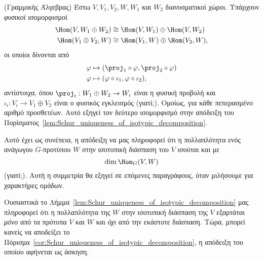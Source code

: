 \documentclass[12pt,a4paper,reqno]{amsart}
\begin{document}
\begin{remark}{{\rm(Γραμμικής Άλγεβρας)}}
Έστω $V, V_1, V_2, W, W_1$ και $W_2$ διανυσματικοί χώροι. Υπάρχουν \emph{φυσικοί} ισομορφισμοί 
\begin{align*}
    \Hom(V, W_1 \oplus W_2) &\cong \Hom(V,W_1) \oplus \Hom(V,W_2) \\ 
    \Hom(V_1\oplus V_2, W) &\cong \Hom(V_1,W) \oplus \Hom(V_2,W),
\end{align*}
οι οποίοι δίνονται από 
\begin{align*}
    \varphi &\mapsto (\proj_1\circ\varphi, \proj_2\circ\varphi) \\ 
    \varphi &\mapsto (\varphi\circ\iota_1, \varphi\circ\iota_2),
\end{align*}
αντίστοιχα, όπου $\proj_i : W_1 \oplus W_2 \to W_i$ είναι η φυσική προβολή και $\iota_i : V_i \to V_1 \oplus V_2$ είναι ο φυσικός εγκλεισμός (γιατί;). Ομοίως, για κάθε πεπερασμένο αριθμό προσθετέων. Αυτό εξηγεί τον δεύτερο ισομορφισμό στην απόδειξη του Πορίσματος~\ref{lem:Schur_uniqueness_of_isotypic_decomposition}.

Αυτό έχει ως συνέπεια, η  απόδειξη να μας πληροφορεί ότι η πολλαπλότητα ενός ανάγωγου $G$-προτύπου $W$ στην ισοτυπική διάσπαση του $V$ ισούται και με 
\[
\dim\Hom_G(V,W)
\]
(γιατί;). Αυτή η συμμετρία θα εξηγεί σε επόμενες παραγράφους, όταν μιλήσουμε για χαρακτήρες ομάδων.
\end{remark}

Ουσιαστικά το Λήμμα~\ref{lem:Schur_uniqueness_of_isotypic_decomposition} μας πληροφορεί ότι η πολλαπλότητα της $W$ στην ισοτυπική διάσπαση της $V$ εξαρτάται \emph{μόνο} από τα πρότυπα $V$ και $W$ και \emph{όχι} από την εκάστοτε διάσπαση. Τώρα, μπορεί κανείς να αποδείξει το Πόρισμα~\ref{cor:Schur_uniqueness_of_isotypic_decomposition}, η απόδειξη του οποίου αφήνεται ως άσκηση.
\end{document}
